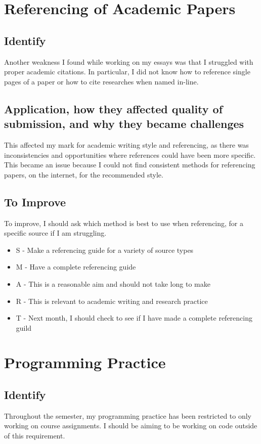 \documentclass{scrartcl}
\begin{document}
\section*{Referencing of Academic Papers}
\subsection*{Identify}
Another weakness I found while working on my essays was that I struggled with proper academic citations. In particular, I did not know how to reference single pages of a paper or how to cite researches when named in-line.

\subsection*{Application, how they affected quality of submission, and why they became challenges}
This affected my mark for academic writing style and referencing, as there was inconsistencies and opportunities where references could have been more specific. This became an issue because I could not find consistent methods for referencing papers, on the internet, for the recommended style.  

\subsection*{To Improve}
To improve, I should ask which method is best to use when referencing, for a specific source if I am struggling.

 \begin{itemize}
   \item  S - Make a referencing guide for a variety of source types
	\item M - Have a complete referencing guide
	\item A - This is a reasonable aim and should not take long to make
	\item R - This is relevant to academic writing and research practice
	\item T - Next month, I should check to see if I have made a complete referencing guild
 \end{itemize}

\section*{Programming Practice}
\subsection*{Identify}
Throughout the semester, my programming practice has been restricted to only working on course assignments. I should be aiming to be working on code outside of this requirement.
\end{document}
